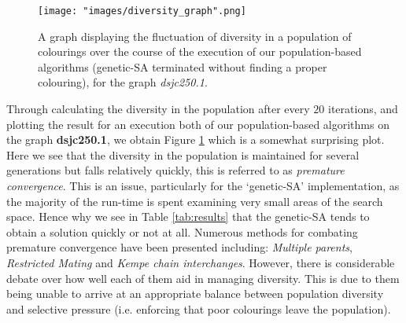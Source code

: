 \documentclass[12pt,a4paper]{article}
\begin{document}
 
 \begin{figure}[h]
\centering
\texttt{[image: "images/diversity\_graph".png]}
\caption{A graph displaying the fluctuation of diversity in a population of colourings over the course of the execution of our population-based algorithms (genetic-SA terminated without finding a proper colouring), for the graph \textit{dsjc250.1}.}
\label{fig:diversity}
\end{figure}

Through calculating the diversity in the population after every $20$ iterations, and plotting the result for an execution both of our population-based algorithms on the graph \textbf{dsjc250.1}, we obtain Figure \ref{fig:diversity} which is a somewhat surprising plot. Here we see that the diversity in the population is maintained for several generations but falls relatively quickly, this is referred to as \textit{premature convergence}. This is an issue, particularly for the `genetic-SA' implementation, as the majority of the run-time is spent examining very small areas of the search space. Hence why we see in Table \ref{tab:results} that the genetic-SA tends to obtain a solution quickly or not at all. Numerous methods for combating premature convergence have been presented including: \textit{Multiple parents}, \textit{Restricted Mating} and \textit{Kempe chain interchanges}. However, there is considerable debate over how well each of them aid in managing diversity. This is due to them being unable to arrive at an appropriate balance between population diversity and selective pressure (i.e. enforcing that poor colourings leave the population). 
\newpage
\end{document}
